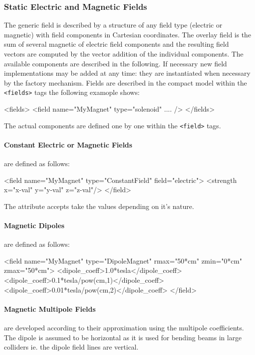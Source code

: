\documentclass[10pt,a4paper]{article}
\begin{document}
\subsubsection{Static Electric and Magnetic Fields}
\label{sec:dd4hep-manual-static-fields}

\noindent
The generic field is described by a structure of any field type (electric or magnetic)
with field components in Cartesian coordinates.
The overlay field is the sum of several magnetic of electric field components
and the resulting field vectors are computed by the vector addition 
of the individual components. The available components are described in the following.
If necessary new field implementations may be added at any time: they are 
instantiated when necessary by the factory mechanism.
Fields are described in the compact model within the {\tt{<fields>}} tags the 
following examople shows:
\begin{code}
  <fields>
    <field name="MyMagnet" type="solenoid"  .... />
  </fields>
\end{code}
The actual components are defined one by one within the {\tt{<field>}} tags.

\paragraph{Constant Electric or Magnetic Fields} are defined as follows:
\begin{code}
  <field  name="MyMagnet" type="ConstantField" field="electric">
    <strength x="x-val" y="y-val" z="z-val"/>
  </field>
\end{code}
The {} attribute accepts take the values {}
depending on it's nature.

\paragraph{Magnetic Dipoles} are defined as follows:
\begin{code}
  <field name="MyMagnet" type="DipoleMagnet"
         rmax="50*cm"
         zmin="0*cm"
         zmax="50*cm">
         <dipole_coeff>1.0*tesla</dipole_coeff>
         <dipole_coeff>0.1*tesla/pow(cm,1)</dipole_coeff>
         <dipole_coeff>0.01*tesla/pow(cm,2)</dipole_coeff>
  </field>
\end{code}

\paragraph{Magnetic Multipole Fields} are developed according to their 
approximation using the multipole coefficients.
The dipole is assumed to be horizontal as it is used for bending beams in large colliders
ie. the dipole field lines are vertical.
\end{document}
